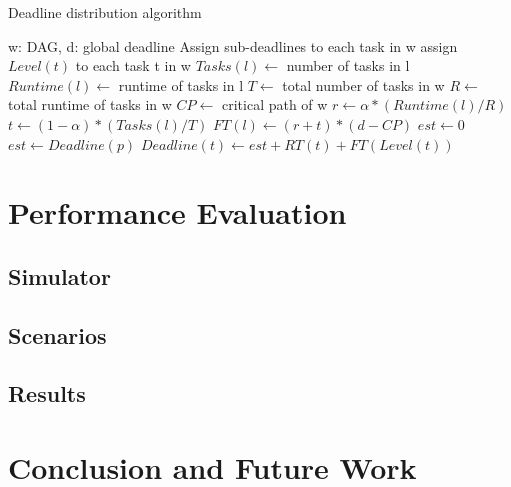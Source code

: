 \documentclass{sig-alternate}
\begin{document}
\begin{algorithm}
\caption{Deadline distribution algorithm}
\label{alg:deadlinedistribution}
\begin{algorithmic}[1]
\Require w: DAG, d: global deadline
\Ensure Assign sub-deadlines to each task in w
    \State assign $Level(t)$ to each task t in w
        \State $Tasks(l) \gets$ number of tasks in l
        \State $Runtime(l) \gets$ runtime of tasks in l
    \EndFor
    \State $T \gets$ total number of tasks in w
    \State $R \gets$ total runtime of tasks in w
    \State $CP \gets$ critical path of w
        \State $r \gets \alpha * (Runtime(l)/R)$
        \State $t \gets (1-\alpha) * (Tasks(l)/T)$
        \State $FT(l) \gets (r + t) * (d - CP)$
    \EndFor
        \State $est \gets 0$
            \State $est \gets Deadline(p)$
        \EndFor
        \State $Deadline(t) \gets est + RT(t) + FT(Level(t))$
    \EndFor
\EndProcedure
\end{algorithmic} 
\end{algorithm}

\section{Performance Evaluation}

\subsection{Simulator}

\subsection{Scenarios}

\subsection{Results}


\section{Conclusion and Future Work}







\end{document}
